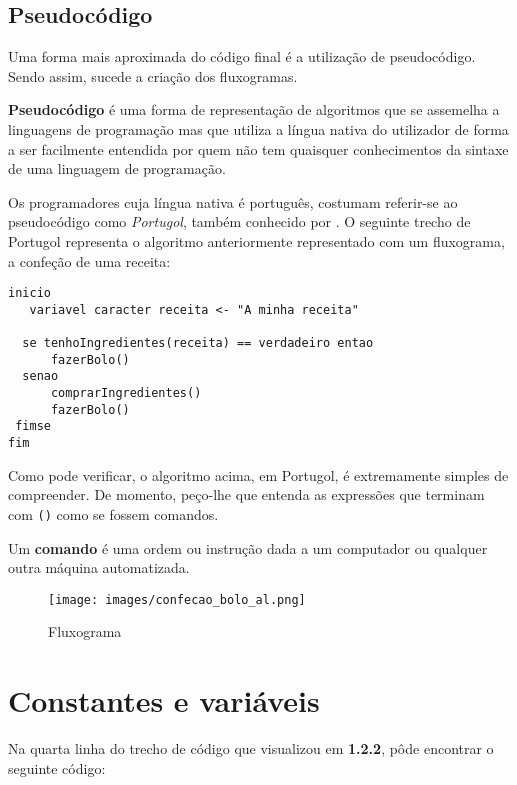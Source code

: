 \subsection{Pseudocódigo}

Uma forma mais aproximada do código final é a utilização de pseudocódigo. Sendo assim, sucede a criação dos fluxogramas.

\begin{defi}
\textbf{Pseudocódigo} é uma forma de representação de algoritmos que se assemelha a linguagens de programação mas que utiliza a língua nativa do utilizador de forma a ser facilmente entendida por quem não tem quaisquer conhecimentos da sintaxe de uma linguagem de programação.
\end{defi}

Os programadores cuja língua nativa é português, costumam referir-se ao pseudocódigo como \textit{Portugol}, também conhecido por . O seguinte trecho de Portugol representa o algoritmo anteriormente representado com um fluxograma, a confeção de uma receita: 

\begin{lstlisting}
inicio      
   variavel caracter receita <- "A minha receita"      
 
  se tenhoIngredientes(receita) == verdadeiro entao      
      fazerBolo()      
  senao      
      comprarIngredientes()      
      fazerBolo()      
 fimse      
fim
\end{lstlisting}
   
Como pode verificar, o algoritmo acima, em Portugol, é extremamente simples de compreender. De momento, peço-lhe que entenda as expressões que terminam com \texttt{()} como se fossem comandos.

\begin{defi}
Um \textbf{comando} é uma ordem ou instrução dada a um computador ou qualquer outra máquina automatizada.
\end{defi}

\begin{figure}[!htbp]
\center\texttt{[image: images/confecao\_bolo\_al.png]}
\caption{Fluxograma }
\end{figure}

\section{Constantes e variáveis}

Na quarta linha do trecho de código que visualizou em \textbf{1.2.2}, pôde encontrar o seguinte código:


